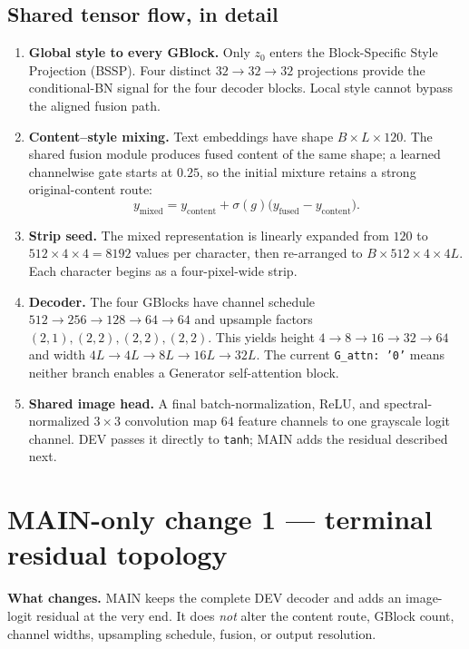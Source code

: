 \documentclass[10pt,a4paper]{article}
\begin{document}
\subsection*{Shared tensor flow, in detail}

\begin{enumerate}[leftmargin=1.55em,itemsep=3pt]
  \item \textbf{Global style to every GBlock.}  Only $z_0$ enters the Block-Specific Style Projection (BSSP).  Four distinct $32\rightarrow32\rightarrow32$ projections provide the conditional-BN signal for the four decoder blocks.  Local style cannot bypass the aligned fusion path.
  \item \textbf{Content--style mixing.}  Text embeddings have shape $B\times L\times120$.  The shared fusion module produces fused content of the same shape; a learned channelwise gate starts at $0.25$, so the initial mixture retains a strong original-content route:
  \[
    y_{\mathrm{mixed}}=y_{\mathrm{content}}+\sigma(g)\big(y_{\mathrm{fused}}-y_{\mathrm{content}}\big).
  \]
  \item \textbf{Strip seed.}  The mixed representation is linearly expanded from $120$ to $512\times4\times4=8192$ values per character, then re-arranged to $B\times512\times4\times4L$.  Each character begins as a four-pixel-wide strip.
  \item \textbf{Decoder.}  The four GBlocks have channel schedule $512\rightarrow256\rightarrow128\rightarrow64\rightarrow64$ and upsample factors $(2,1),(2,2),(2,2),(2,2)$.  This yields height $4\rightarrow8\rightarrow16\rightarrow32\rightarrow64$ and width $4L\rightarrow4L\rightarrow8L\rightarrow16L\rightarrow32L$.  The current \texttt{G\_attn: '0'} means neither branch enables a Generator self-attention block.
  \item \textbf{Shared image head.}  A final batch-normalization, ReLU, and spectral-normalized $3\times3$ convolution map $64$ feature channels to one grayscale logit channel.  DEV passes it directly to \texttt{tanh}; MAIN adds the residual described next.
\end{enumerate}

\section{MAIN-only change 1 --- terminal residual topology}

\textbf{What changes.}  MAIN keeps the complete DEV decoder and adds an image-logit residual at the very end.  It does \emph{not} alter the content route, GBlock count, channel widths, upsampling schedule, fusion, or output resolution.
\end{document}

